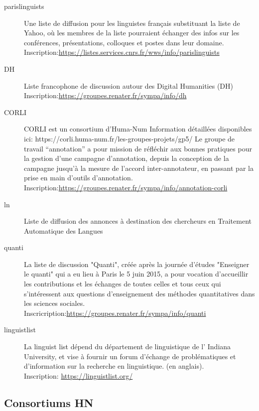 \documentclass{book}
\begin{document}
\begin{description}
	\item[parislinguists]
	Une liste de diffusion pour les linguistes français substituant la liste de Yahoo, où les membres de la liste pourraient échanger des infos sur les conférences, présentations, colloques et postes dans leur domaine.\\
	Inscription:\url{https://listes.services.cnrs.fr/wws/info/parislinguists}
	\item[DH]
	Liste francophone de discussion autour des Digital Humanities (DH)\\
	Inscription:\url{https://groupes.renater.fr/sympa/info/dh}
	\item[CORLI]
	CORLI est un consortium d'Huma-Num
	Information détaillées disponibles ici: https://corli.huma-num.fr/les-groupes-projets/gp5/
	Le groupe de travail “annotation” a pour mission de réfléchir aux bonnes pratiques pour la gestion d’une campagne d’annotation, depuis la conception de la campagne jusqu’à la mesure de l’accord inter-annotateur, en passant par la prise en main d’outils d’annotation.\\
	Inscription:\url{https://groupes.renater.fr/sympa/info/annotation-corli}
	\item[ln]
	Liste de diffusion des annonces à destination des chercheurs en Traitement Automatique des Langues  
	\item[quanti]
    La liste de discussion "Quanti", créée après la journée d'études "Enseigner le quanti" qui a eu lieu à Paris le 5 juin 2015, a pour vocation d'accueillir les contributions et les échanges de toutes celles et tous ceux qui s'intéressent aux questions d'enseignement des méthodes quantitatives dans les sciences sociales. \\
    Inscricription:\url{https://groupes.renater.fr/sympa/info/quanti}
	\item[linguistlist]
    La linguist list dépend du département de linguistique de l' Indiana University, et vise à fournir un forum d'échange de problématiques et d'information sur la recherche en linguistique. (en anglais). \\
    Inscription: \url{https://linguistlist.org/}
    
\end{description}

\subsection{Consortiums HN}
\end{document}
